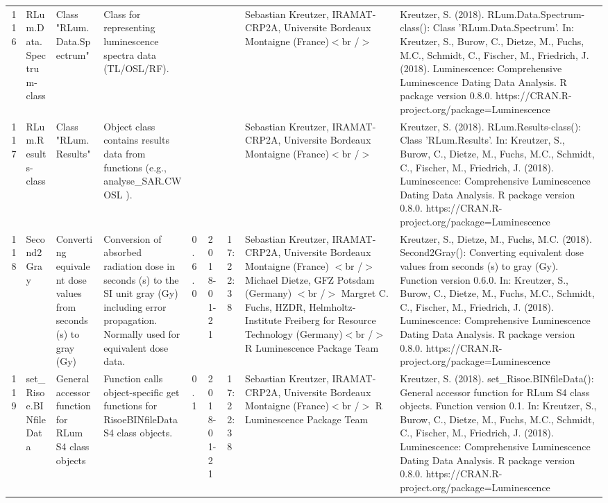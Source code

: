 \begin{table}[ht]
\begin{tabular}{rllllllll}
 \\ 
  116 & RLum.Data.Spectrum-class & Class  "RLum.Data.Spectrum" & Class for representing luminescence spectra data (TL/OSL/RF). &  &  &  & Sebastian Kreutzer, IRAMAT-CRP2A, Universite Bordeaux Montaigne (France)$<$br /$>$ & Kreutzer, S. (2018). RLum.Data.Spectrum-class(): Class 'RLum.Data.Spectrum'. In: Kreutzer, S., Burow, C., Dietze, M., Fuchs, M.C., Schmidt, C., Fischer, M., Friedrich, J. (2018). Luminescence: Comprehensive Luminescence Dating Data Analysis. R package version 0.8.0. https://CRAN.R-project.org/package=Luminescence
 \\ 
  117 & RLum.Results-class & Class  "RLum.Results" & Object class contains results data from functions (e.g.,  analyse\_SAR.CWOSL ). &  &  &  & Sebastian Kreutzer, IRAMAT-CRP2A, Universite Bordeaux Montaigne (France)$<$br /$>$ & Kreutzer, S. (2018). RLum.Results-class(): Class 'RLum.Results'. In: Kreutzer, S., Burow, C., Dietze, M., Fuchs, M.C., Schmidt, C., Fischer, M., Friedrich, J. (2018). Luminescence: Comprehensive Luminescence Dating Data Analysis. R package version 0.8.0. https://CRAN.R-project.org/package=Luminescence
 \\ 
  118 & Second2Gray & Converting equivalent dose values from seconds (s) to gray (Gy) & Conversion of absorbed radiation dose in seconds (s) to the SI unit gray (Gy) including error propagation. Normally used for equivalent dose data. & 0.6.0 & 2018-01-21 & 17:22:38
 & Sebastian Kreutzer, IRAMAT-CRP2A, Universite Bordeaux Montaigne (France) $<$br /$>$ Michael Dietze, GFZ Potsdam (Germany) $<$br /$>$ Margret C. Fuchs, HZDR, Helmholtz-Institute Freiberg for Resource Technology (Germany)$<$br /$>$  R Luminescence Package Team & Kreutzer, S., Dietze, M., Fuchs, M.C. (2018). Second2Gray(): Converting equivalent dose values from seconds (s) to gray (Gy). Function version 0.6.0. In: Kreutzer, S., Burow, C., Dietze, M., Fuchs, M.C., Schmidt, C., Fischer, M., Friedrich, J. (2018). Luminescence: Comprehensive Luminescence Dating Data Analysis. R package version 0.8.0. https://CRAN.R-project.org/package=Luminescence
 \\ 
  119 & set\_Risoe.BINfileData & General accessor function for RLum S4 class objects & Function calls object-specific get functions for RisoeBINfileData S4 class objects. & 0.1 & 2018-01-21 & 17:22:38
 & Sebastian Kreutzer, IRAMAT-CRP2A, Universite Bordeaux Montaigne (France)$<$br /$>$  R Luminescence Package Team & Kreutzer, S. (2018). set\_Risoe.BINfileData(): General accessor function for RLum S4 class objects. Function version 0.1. In: Kreutzer, S., Burow, C., Dietze, M., Fuchs, M.C., Schmidt, C., Fischer, M., Friedrich, J. (2018). Luminescence: Comprehensive Luminescence Dating Data Analysis. R package version 0.8.0. https://CRAN.R-project.org/package=Luminescence

\end{tabular}
\end{table}
